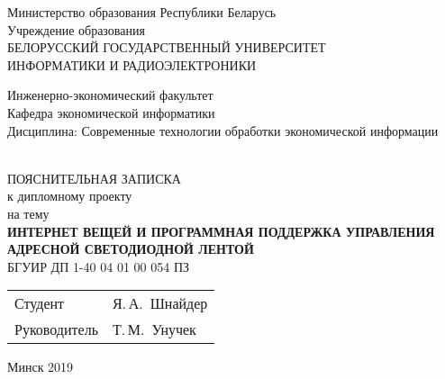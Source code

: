 \begin{titlepage}
  \begin{center}
    Министерство образования Республики Беларусь\\[1em]
    Учреждение образования\\
    БЕЛОРУССКИЙ ГОСУДАРСТВЕННЫЙ УНИВЕРСИТЕТ \\
    ИНФОРМАТИКИ И РАДИОЭЛЕКТРОНИКИ\\[1em]

    \begin{minipage}{\textwidth}
      \begin{flushleft}
          Инженерно-экономический факультет\\
          Кафедра экономической информатики\\
          Дисциплина: Современные технологии обработки экономической информации
      \end{flushleft}
    \end{minipage}\\[3em]

    {ПОЯСНИТЕЛЬНАЯ ЗАПИСКА}\\
    {к дипломному проекту}\\
    {на тему}\\[3em]
    \textbf{\large\MakeUppercase{Интернет вещей и программная поддержка управления адресной светодиодной лентой}}\\[1em]


    {БГУИР ДП  1-40 04 01 00 054 ПЗ}\\[2em]
    
    \begin{tabular}{ p{}p{} }
      Студент & Я.\,А.~Шнайдер \\
      Руководитель & Т.\,М.~Унучек
    \end{tabular}
    
    \vfill
    {\normalsize Минск 2019}
  \end{center}
\end{titlepage}
